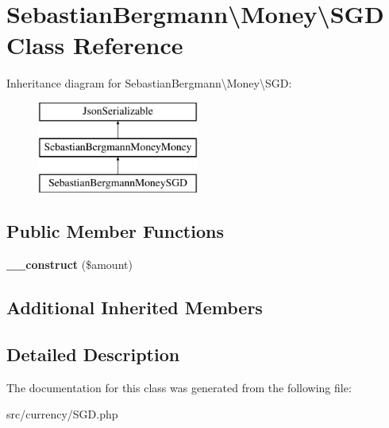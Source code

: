 \hypertarget{classSebastianBergmann_1_1Money_1_1SGD}{}\section{Sebastian\+Bergmann\textbackslash{}Money\textbackslash{}S\+G\+D Class Reference}
\label{classSebastianBergmann_1_1Money_1_1SGD}
Inheritance diagram for Sebastian\+Bergmann\textbackslash{}Money\textbackslash{}S\+G\+D\+:\begin{figure}[H]
\begin{center}
\leavevmode
\includegraphics[height=3.000000cm]{classSebastianBergmann_1_1Money_1_1SGD}
\end{center}
\end{figure}
\subsection*{Public Member Functions}
\begin{DoxyCompactItemize}
\item 
\hypertarget{classSebastianBergmann_1_1Money_1_1SGD_a35b49a60003f37fec363aeb4e38c0273}{}{\bfseries \+\_\+\+\_\+construct} (\$amount)\label{classSebastianBergmann_1_1Money_1_1SGD_a35b49a60003f37fec363aeb4e38c0273}

\end{DoxyCompactItemize}
\subsection*{Additional Inherited Members}


\subsection{Detailed Description}


The documentation for this class was generated from the following file\+:\begin{DoxyCompactItemize}
\item 
src/currency/S\+G\+D.\+php\end{DoxyCompactItemize}
